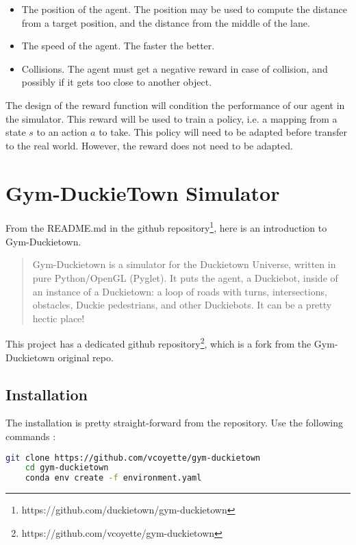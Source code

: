 \documentclass[12pt]{article}
\begin{document}
\begin{itemize}
    \item The position of the agent. The position may be used to compute the distance from a target position, and the distance from the middle of the lane.
    \item The speed of the agent. The faster the better.
    \item Collisions. The agent must get a negative reward in case of collision, and possibly if it gets too  close to another object.
\end{itemize}

The design of the reward function will condition the performance of our agent in the simulator. This reward will be used to train a policy, i.e. a mapping from a state $s$ to an action $a$ to take. This policy will need to be adapted before transfer to the real world. However, the reward does not need to be adapted. 

\section{Gym-DuckieTown Simulator}

From the README.md in the github repository\footnote{https://github.com/duckietown/gym-duckietown}, here is an introduction to Gym-Duckietown. 

 \begin{quotation}
Gym-Duckietown is a simulator for the Duckietown Universe, written in pure Python/OpenGL (Pyglet). It puts the agent, a Duckiebot, inside of an instance of a Duckietown: a loop of roads with turns, intersections, obstacles, Duckie pedestrians, and other Duckiebots. It can be a pretty hectic place!
 \end{quotation}

 This project has a dedicated github repository\footnote{https://github.com/vcoyette/gym-duckietown}, which is a fork from the Gym-Duckietown original repo.

\subsection{Installation}
The installation is pretty straight-forward from the repository. Use the following commands :

\begin{lstlisting}[language=bash]
    git clone https://github.com/vcoyette/gym-duckietown
    cd gym-duckietown
    conda env create -f environment.yaml
\end{lstlisting}
\end{document}
